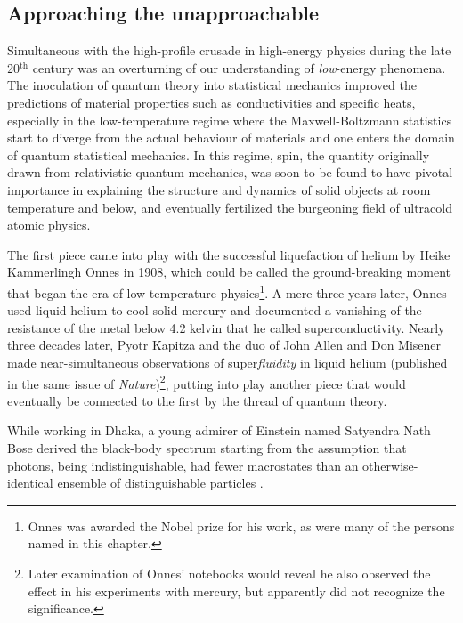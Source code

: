 \subsection*{Approaching the unapproachable} %

	Simultaneous with the high-profile crusade in high-energy physics during the late 20$^\textrm{th}$ century was an overturning of our understanding of \emph{low}-energy phenomena.
	The inoculation of quantum theory into statistical mechanics improved the predictions of material properties such as conductivities and specific heats, especially in the low-temperature regime where the Maxwell-Boltzmann statistics start to diverge from the actual behaviour of materials and one enters the domain of quantum statistical mechanics.
	In this regime, spin, the quantity originally drawn from relativistic quantum mechanics, was soon to be found to have pivotal importance in explaining the structure and dynamics of solid objects at room temperature and below, and eventually fertilized the burgeoning field of ultracold atomic physics.

	The first piece came into play with the successful liquefaction of helium by Heike Kammerlingh Onnes in 1908, which could be called the ground-breaking moment that began the era of low-temperature physics\footnote{Onnes was awarded the Nobel prize for his work, as were many of the persons named in this chapter.}.
	A mere three years later, Onnes used liquid helium to cool solid mercury and documented a vanishing of the resistance of the metal below 4.2 kelvin that he called superconductivity.
	Nearly three decades later, Pyotr Kapitza \cite{Kapitza38} and the duo of John Allen and Don Misener \cite{Allen38} made near-simultaneous observations  of super\emph{fluidity} in liquid helium (published in the same issue of \emph{Nature})\footnote{Later examination of Onnes' notebooks would reveal he also observed the effect in his experiments with mercury, but apparently did not recognize the significance.},  putting into play another piece that would eventually be connected to the first by the thread of quantum theory. 

	While working in Dhaka, a young admirer of Einstein named Satyendra Nath Bose derived the black-body spectrum starting from the assumption that photons, being indistinguishable, had fewer macrostates than an otherwise-identical ensemble of distinguishable particles \cite{Bose24}.

